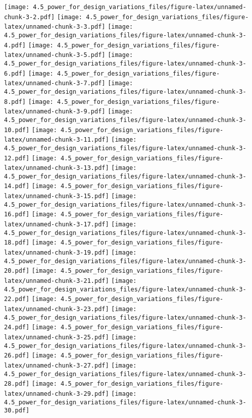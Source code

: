 \documentclass[]{article}
\begin{document}
\texttt{[image: 4.5\_power\_for\_design\_variations\_files/figure-latex/unnamed-chunk-3-2.pdf]}
\texttt{[image: 4.5\_power\_for\_design\_variations\_files/figure-latex/unnamed-chunk-3-3.pdf]}
\texttt{[image: 4.5\_power\_for\_design\_variations\_files/figure-latex/unnamed-chunk-3-4.pdf]}
\texttt{[image: 4.5\_power\_for\_design\_variations\_files/figure-latex/unnamed-chunk-3-5.pdf]}
\texttt{[image: 4.5\_power\_for\_design\_variations\_files/figure-latex/unnamed-chunk-3-6.pdf]}
\texttt{[image: 4.5\_power\_for\_design\_variations\_files/figure-latex/unnamed-chunk-3-7.pdf]}
\texttt{[image: 4.5\_power\_for\_design\_variations\_files/figure-latex/unnamed-chunk-3-8.pdf]}
\texttt{[image: 4.5\_power\_for\_design\_variations\_files/figure-latex/unnamed-chunk-3-9.pdf]}
\texttt{[image: 4.5\_power\_for\_design\_variations\_files/figure-latex/unnamed-chunk-3-10.pdf]}
\texttt{[image: 4.5\_power\_for\_design\_variations\_files/figure-latex/unnamed-chunk-3-11.pdf]}
\texttt{[image: 4.5\_power\_for\_design\_variations\_files/figure-latex/unnamed-chunk-3-12.pdf]}
\texttt{[image: 4.5\_power\_for\_design\_variations\_files/figure-latex/unnamed-chunk-3-13.pdf]}
\texttt{[image: 4.5\_power\_for\_design\_variations\_files/figure-latex/unnamed-chunk-3-14.pdf]}
\texttt{[image: 4.5\_power\_for\_design\_variations\_files/figure-latex/unnamed-chunk-3-15.pdf]}
\texttt{[image: 4.5\_power\_for\_design\_variations\_files/figure-latex/unnamed-chunk-3-16.pdf]}
\texttt{[image: 4.5\_power\_for\_design\_variations\_files/figure-latex/unnamed-chunk-3-17.pdf]}
\texttt{[image: 4.5\_power\_for\_design\_variations\_files/figure-latex/unnamed-chunk-3-18.pdf]}
\texttt{[image: 4.5\_power\_for\_design\_variations\_files/figure-latex/unnamed-chunk-3-19.pdf]}
\texttt{[image: 4.5\_power\_for\_design\_variations\_files/figure-latex/unnamed-chunk-3-20.pdf]}
\texttt{[image: 4.5\_power\_for\_design\_variations\_files/figure-latex/unnamed-chunk-3-21.pdf]}
\texttt{[image: 4.5\_power\_for\_design\_variations\_files/figure-latex/unnamed-chunk-3-22.pdf]}
\texttt{[image: 4.5\_power\_for\_design\_variations\_files/figure-latex/unnamed-chunk-3-23.pdf]}
\texttt{[image: 4.5\_power\_for\_design\_variations\_files/figure-latex/unnamed-chunk-3-24.pdf]}
\texttt{[image: 4.5\_power\_for\_design\_variations\_files/figure-latex/unnamed-chunk-3-25.pdf]}
\texttt{[image: 4.5\_power\_for\_design\_variations\_files/figure-latex/unnamed-chunk-3-26.pdf]}
\texttt{[image: 4.5\_power\_for\_design\_variations\_files/figure-latex/unnamed-chunk-3-27.pdf]}
\texttt{[image: 4.5\_power\_for\_design\_variations\_files/figure-latex/unnamed-chunk-3-28.pdf]}
\texttt{[image: 4.5\_power\_for\_design\_variations\_files/figure-latex/unnamed-chunk-3-29.pdf]}
\texttt{[image: 4.5\_power\_for\_design\_variations\_files/figure-latex/unnamed-chunk-3-30.pdf]}
\end{document}
